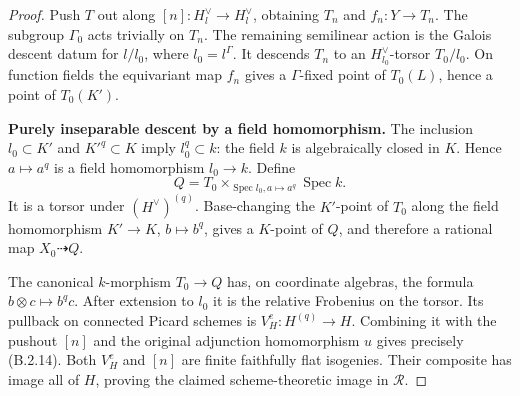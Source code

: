 \begin{proof}
Push $T$ out along $[n]:H_l^\vee\to H_l^\vee$, obtaining
$T_n$ and $f_n:Y\to T_n$.  The subgroup $\Gamma_0$ acts
trivially on $T_n$.  The remaining semilinear action is the
Galois descent datum for $l/l_0$, where $l_0=l^\Gamma$.
It descends $T_n$ to an $H^\vee_{l_0}$-torsor $T_0/l_0$.
On function fields the equivariant map $f_n$ gives a
$\Gamma$-fixed point of $T_0(L)$, hence a point of $T_0(K')$.

\par\smallskip\noindent\textbf{Purely inseparable descent by a field homomorphism.}\quad
The inclusion $l_0\subset K'$ and $K'^q\subset K$ imply
$l_0^q\subset k$: the field $k$ is algebraically closed in
$K$.  Hence $a\mapsto a^q$ is a field homomorphism
$l_0\to k$.  Define
\[
 Q=T_0\times_{\operatorname{Spec}l_0, a\mapsto a^q}
                   \operatorname{Spec}k.
\]
It is a torsor under $(H^\vee)^{(q)}$.
Base-changing the $K'$-point of $T_0$ along the field
homomorphism $K'\to K$, $b\mapsto b^q$, gives a $K$-point
of $Q$, and therefore a rational map $X_0\dashrightarrow Q$.

The canonical $k$-morphism $T_0\to Q$ has, on coordinate
algebras, the formula $b\otimes c\mapsto b^q c$.
After extension to $l_0$ it is the relative Frobenius on the
torsor.  Its pullback on connected Picard schemes is
$V_H^e:H^{(q)}\to H$.  Combining it with the pushout $[n]$
and the original adjunction homomorphism $u$ gives precisely
(B.2.14).  Both $V_H^e$ and $[n]$ are finite faithfully flat
isogenies.  Their composite has image all of $H$, proving
the claimed scheme-theoretic image in $\mathcal R$.
\end{proof}

